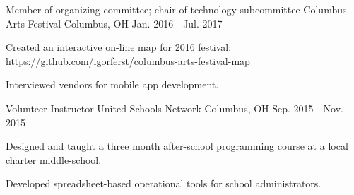 

\begin{cventries}

  \cventry
    {Member of organizing committee; chair of technology subcommittee} %
    {Columbus Arts Festival} %
    {Columbus, OH} %
    {Jan. 2016 - Jul. 2017} %
    {
      \begin{cvitems} %
        \item {Created an interactive on-line map for 2016 festival: \url{https://github.com/igorferst/columbus-arts-festival-map}}
        \item {Interviewed vendors for mobile app development.}
      \end{cvitems}
    }

  \cventry
    {Volunteer Instructor} %
    {United Schools Network} %
    {Columbus, OH} %
    {Sep. 2015 - Nov. 2015} %
    {
      \begin{cvitems} %
        \item {Designed and taught a three month after-school programming course at a local charter middle-school.}
        \item {Developed spreadsheet-based operational tools for school administrators.}
      \end{cvitems}
    }

\end{cventries}
